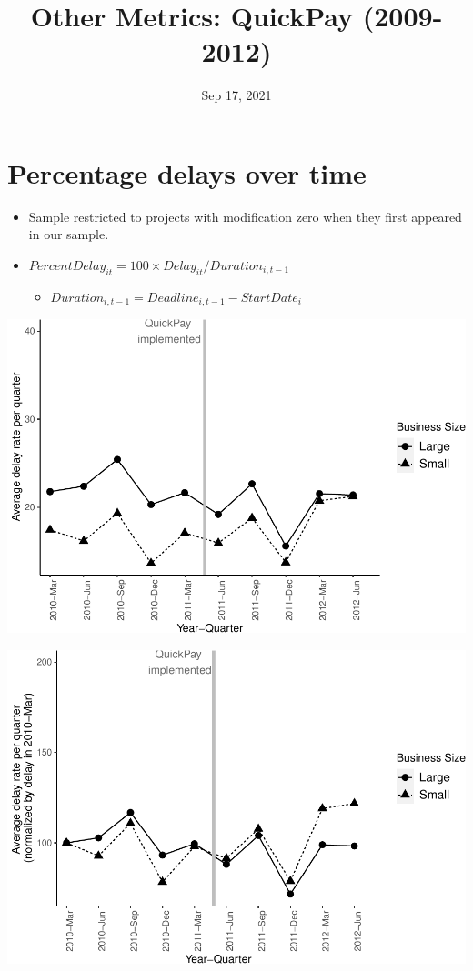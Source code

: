 \documentclass[
]{article}
\title{Other Metrics: QuickPay (2009-2012)}
\author{}
\date{\vspace{-2.5em}Sep 17, 2021}
\providecommand{\tightlist}{%
  \setlength{\itemsep}{0pt}\setlength{\parskip}{0pt}}
\begin{document}
\maketitle

\hypertarget{percentage-delays-over-time}{%
\section{Percentage delays over
time}\label{percentage-delays-over-time}}

\begin{itemize}
\tightlist
\item
  Sample restricted to projects with modification zero when they first
  appeared in our sample.
\item
  \(PercentDelay_{it}=100 \times Delay_{it}/Duration_{i,t-1}\)

  \begin{itemize}
  \tightlist
  \item
    \(Duration_{i,t-1} = Deadline_{i,t-1} - StartDate_i\)
  \end{itemize}
\end{itemize}

\includegraphics{qp_first_pc_delay_files/figure-latex/plot_relative_delay-1.pdf}

\includegraphics{qp_first_pc_delay_files/figure-latex/normalized_plot-1.pdf}
\end{document}
